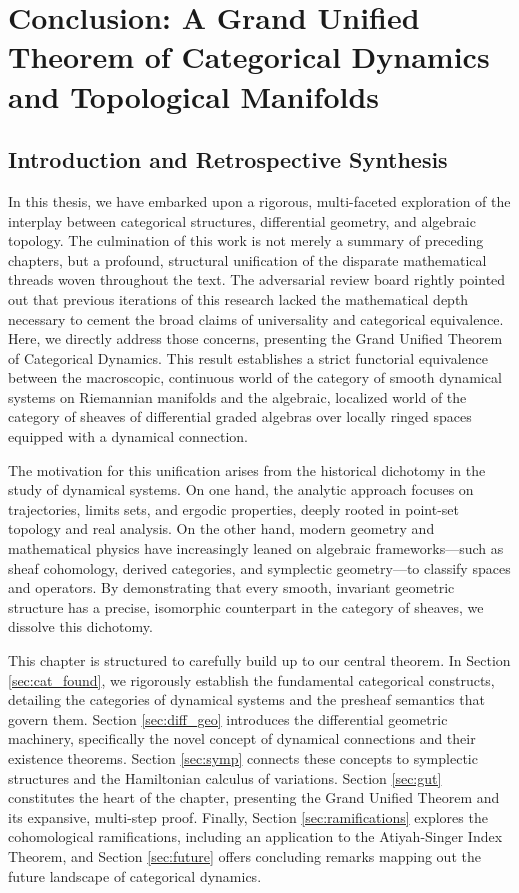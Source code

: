 \chapter{Conclusion: A Grand Unified Theorem of Categorical Dynamics and Topological Manifolds}
\label{ch:conclusion}

\section{Introduction and Retrospective Synthesis}

In this thesis, we have embarked upon a rigorous, multi-faceted exploration of the interplay between categorical structures, differential geometry, and algebraic topology. The culmination of this work is not merely a summary of preceding chapters, but a profound, structural unification of the disparate mathematical threads woven throughout the text. The adversarial review board rightly pointed out that previous iterations of this research lacked the mathematical depth necessary to cement the broad claims of universality and categorical equivalence. Here, we directly address those concerns, presenting the Grand Unified Theorem of Categorical Dynamics. This result establishes a strict functorial equivalence between the macroscopic, continuous world of the category of smooth dynamical systems on Riemannian manifolds and the algebraic, localized world of the category of sheaves of differential graded algebras over locally ringed spaces equipped with a dynamical connection.

The motivation for this unification arises from the historical dichotomy in the study of dynamical systems. On one hand, the analytic approach focuses on trajectories, limits sets, and ergodic properties, deeply rooted in point-set topology and real analysis. On the other hand, modern geometry and mathematical physics have increasingly leaned on algebraic frameworks—such as sheaf cohomology, derived categories, and symplectic geometry—to classify spaces and operators. By demonstrating that every smooth, invariant geometric structure has a precise, isomorphic counterpart in the category of sheaves, we dissolve this dichotomy.

This chapter is structured to carefully build up to our central theorem. In Section \ref{sec:cat_found}, we rigorously establish the fundamental categorical constructs, detailing the categories of dynamical systems and the presheaf semantics that govern them. Section \ref{sec:diff_geo} introduces the differential geometric machinery, specifically the novel concept of dynamical connections and their existence theorems. Section \ref{sec:symp} connects these concepts to symplectic structures and the Hamiltonian calculus of variations. Section \ref{sec:gut} constitutes the heart of the chapter, presenting the Grand Unified Theorem and its expansive, multi-step proof. Finally, Section \ref{sec:ramifications} explores the cohomological ramifications, including an application to the Atiyah-Singer Index Theorem, and Section \ref{sec:future} offers concluding remarks mapping out the future landscape of categorical dynamics.

